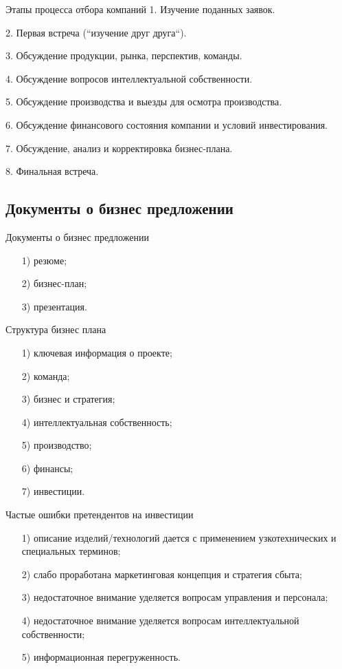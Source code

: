 \documentclass[_Venture_p2.tex]{subfiles}
\begin{document}
\begin{frame}{Этапы процесса отбора компаний}
1.	Изучение поданных заявок.

2.	Первая встреча (``изучение друг друга``).

3.	Обсуждение продукции, рынка, перспектив, команды.

4.	Обсуждение вопросов интеллектуальной собственности.

5.	Обсуждение производства и выезды для осмотра производства.

6.	Обсуждение финансового состояния компании и условий инвестирования.

7.	Обсуждение, анализ и корректировка бизнес-плана.

8.	Финальная встреча.
\end{frame}

\subsection{Документы о бизнес предложении}
\begin{frame}{Документы о бизнес предложении}
\begin{itemize}
	\item[1)] резюме; 
	\item[2)] бизнес-план; 
	\item[3)] презентация.
\end{itemize}
\end{frame}

\begin{frame}{Структура бизнес плана}
\begin{itemize}
	\item[1)] ключевая информация о проекте;
	\item[2)] команда;
	\item[3)] бизнес и стратегия;
	\item[4)] интеллектуальная собственность;
	\item[5)] производство;
	\item[6)] финансы;
	\item[7)] инвестиции.
\end{itemize}
\end{frame}

\begin{frame}{Частые ошибки претендентов на инвестиции}
\begin{itemize}
	\item[1)] описание изделий/технологий дается с применением узкотехнических и специальных терминов;
	\item[2)] 	слабо проработана маркетинговая концепция и стратегия сбыта;
	\item[3)] 	недостаточное внимание уделяется вопросам управления и персонала;
	\item[4)] 	недостаточное внимание уделяется вопросам интеллектуальной собственности;
	\item[5)] 	информационная перегруженность.
\end{itemize}
\end{frame}
\end{document}
